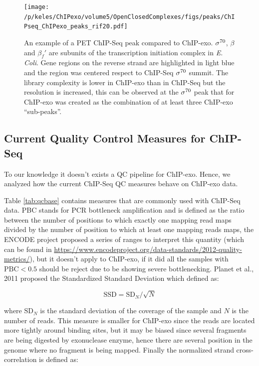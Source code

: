 \documentclass[11pt]{article}\usepackage[]{graphicx}\usepackage[]{color}
\begin{document}
\begin{figure}[H]
  \centering
  \texttt{[image: /p/keles/ChIPexo/volume5/OpenClosedComplexes/figs/peaks/ChIPseq\_ChIPexo\_peaks\_rif20.pdf]}
  \caption{An example of a PET ChIP-Seq peak compared to
    ChIP-exo. $\sigma^{70}$, $\beta$ and $\beta_f'$ are subunits of the
    transcription initiation complex in \emph{E. Coli}. Gene regions
    on the reverse strand are highlighted in light blue and the region
    was centered respect to ChIP-Seq $\sigma^{70}$ summit. The library
    complexity is lower in ChIP-exo than in ChIP-Seq but the
    resolution is increased, this can be observed at the $\sigma^{70}$ peak
    that for ChIP-exo was created as the combination of at least three
    ChIP-exo ``sub-peaks''.}
  \label{fig:exo_example}
\end{figure}

\subsection{Current Quality Control Measures for ChIP-Seq}
\label{sec:QC_chipseq}

To our knowledge it doesn't exists a QC pipeline for ChIP-exo. Hence,
we analyzed how the current ChIP-Seq QC measures behave on ChIP-exo
data.

Table \ref{tab:qcbase} contains measures that are commonly used with
ChIP-Seq data. PBC stands for PCR bottleneck amplification and is
defined as the ratio between the number of positions to which exactly
one mapping read maps divided by the number of position to which at
least one mapping reads maps, the ENCODE project proposed a series of
ranges to interpret this quantity (which can be found in
\url{https://www.encodeproject.org/data-standards/2012-quality-metrics/}),
but it doesn't apply to ChIP-exo, if it did all the samples with
$\mbox{PBC} < 0.5$ should be reject due to be showing severe
bottlenecking. Planet et al., 2011 proposed the Standardized Standard
Deviation which defined as:

\[
\mbox{SSD} = \mbox{SD}_N / \sqrt{N} 
\]

where $\mbox{SD}_N$ is the standard deviation of the coverage of the
sample and $N$ is the number of reads. This measure is smaller for
ChIP-exo since the reads are located more tightly around binding
sites, but it may be biased since several fragments are being
digested by exonuclease enzyme, hence there are several position in
the genome where no fragment is being mapped. Finally the normalized
strand cross-correlation is defined as:
\end{document}
